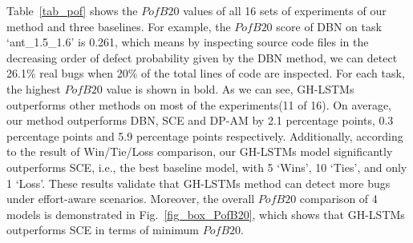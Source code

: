 \documentclass[journal]{IEEEtran}
\begin{document}
Table~\ref{tab_pof} shows the $PofB20$ values of all 16 sets of experiments of our method and three baselines. For example, the $PofB20$ score of DBN on task `ant\_1.5\_1.6' is 0.261, which means by inspecting source code files in the decreasing order of defect probability given by the DBN method, we can detect 26.1\% real bugs when 20\% of the total lines of code are inspected. For each task, the highest $PofB20$ value is shown in bold. As we can see, GH-LSTMs outperforms other methods on most of the experiments(11 of 16). On average, our method outperforms DBN, SCE and DP-AM by 2.1 percentage points, 0.3 percentage points and 5.9 percentage points respectively. Additionally, according to the result of Win/Tie/Loss comparison, our GH-LSTMs model significantly outperforms SCE, i.e., the best baseline model, with 5 `Wins', 10 `Ties', and only 1 `Loss'. These results validate that GH-LSTMs method can detect more bugs under effort-aware scenarios. Moreover, the overall $PofB20$ comparison of 4 models is demonstrated in Fig.~\ref{fig_box_PofB20}, which shows that GH-LSTMs outperforms SCE in terms of minimum $PofB20$.
\end{document}
